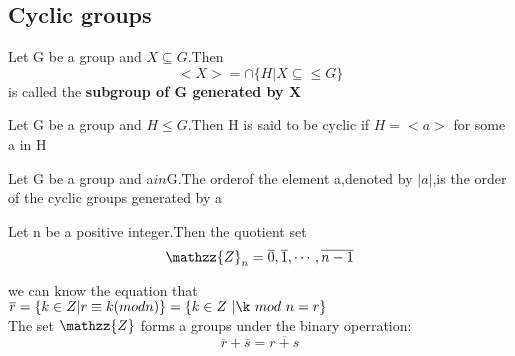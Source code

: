 \documentclass[cn,10pt,math=newtx,citestyle=gb7714-2015,bibstyle=gb7714-2015]{elegantbook}
\begin{document}



\subsection{Cyclic groups}
\begin{definition}
    Let G be a group and $X\subseteq G$.Then
    \begin{equation*}
        <X> = \cap \{H|X\subseteq \leq G\}
    \end{equation*}
    is called the \textbf{subgroup of G generated by X}
\end{definition}


\begin{definition}
    Let G be a group and $H\leq G$.Then H is said to be cyclic if $H =<a>$ for some a in H
\end{definition}

\begin{definition}
    Let G be a group and a$in$G.The orderof the element a,denoted by $|a|$,is the order of the cyclic groups generated by a
\end{definition}

\begin{definition}
    Let n be a positive integer.Then the quotient set \begin{equation*}
        \mathzz{Z}_n = {\overline{0},\overline{1},\cdots,\overline{n-1}}
    \end{equation*}
\end{definition}
\begin{example}
we can know the equation that $\overline{r}=\{k\in Z|r\equiv k(mod n)\}=\{k\in Z\ | \k\  mod\ n = r\}$
\\
    The set $\mathzz{Z}$ forms a groups under the binary operration:
    \begin{equation*}
        \overline{r} + \overline{s}=\overline{r+s}
    \end{equation*}
\end{example}
\end{document}
